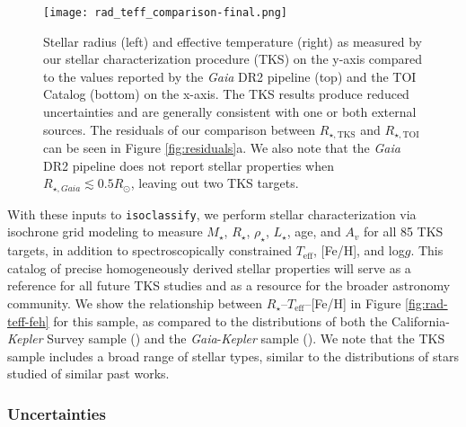 \documentclass[twocolumn]{aastex63}
\begin{document}
\begin{figure*}[ht]
\centering
\texttt{[image: rad\_teff\_comparison-final.png]}
\caption{Stellar radius (left) and effective temperature (right) as measured by our stellar characterization procedure (TKS) on the y-axis compared to the values reported by the \textit{Gaia} DR2 pipeline (top) and the TOI Catalog (bottom) on the x-axis. The TKS results produce reduced uncertainties and are generally consistent with one or both external sources. The residuals of our comparison between $R_{\star, \textrm{TKS}}$ and $R_{\star, \textrm{TOI}}$ can be seen in Figure \ref{fig:residuals}a. We also note that the \textit{Gaia} DR2 pipeline does not report stellar properties when $R_{\star, Gaia} \lesssim 0.5 R_\odot$, leaving out two TKS targets.}
\label{fig:rad-teff}
\end{figure*}

With these inputs to \texttt{isoclassify}, we perform stellar characterization via isochrone grid modeling to measure $M_{\star}$, $R_{\star}$, $\rho_{\star}$, $L_{\star}$, age, and $A_v$ for all 85 TKS targets, in addition to spectroscopically constrained $T_\textrm{eff}$, [Fe/H], and log$g$. This catalog of precise homogeneously derived stellar properties will serve as a reference for all future TKS studies and as a resource for the broader astronomy community. We show the relationship between $R_{\star}$--$T_\textrm{eff}$--[Fe/H] in Figure \ref{fig:rad-teff-feh} for this sample, as compared to the distributions of both the California-\emph{Kepler} Survey sample (\citealt{Petigura17}) and the \emph{Gaia}-\emph{Kepler} sample (\citealt{Berger20}). We note that the TKS sample includes a broad range of stellar types, similar to the distributions of stars studied of similar past works.

\subsubsection{Uncertainties}
\label{sec:uncertainties}
\end{document}
